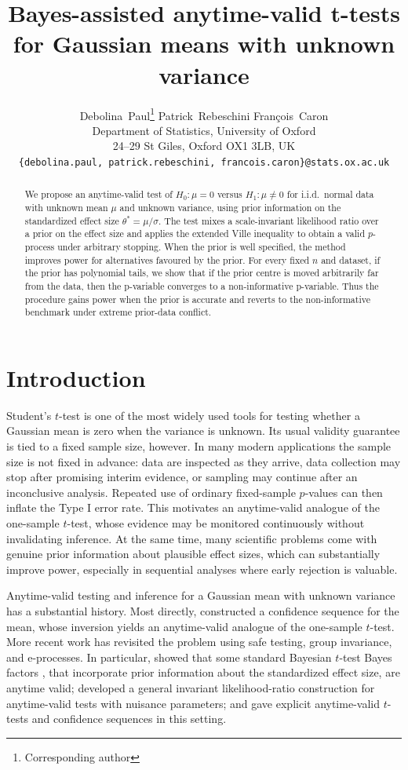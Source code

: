 \documentclass{article}
\title{Bayes-assisted anytime-valid t-tests for
Gaussian means with unknown variance}
\author{%
  Debolina~Paul\thanks{Corresponding author}
  \hspace{1.5cm}
  Patrick~Rebeschini
  \hspace{1.5cm}
  Fran\c{c}ois~Caron
  \\
  Department of Statistics, University of Oxford\\
  24--29 St Giles, Oxford OX1 3LB, UK\\
  \texttt{\{debolina.paul, patrick.rebeschini, francois.caron\}@stats.ox.ac.uk}
}
\begin{document}
\maketitle


\begin{abstract}
  We propose an anytime-valid test of $H_0:\mu=0$ versus $H_1:\mu\neq 0$ for i.i.d.\ normal data with unknown mean $\mu$ and unknown variance, using prior information on the standardized effect size $\theta^\ast=\mu/\sigma$. The test mixes a scale-invariant likelihood ratio over a prior on the effect size and applies the extended Ville inequality to obtain a valid $p$-process under arbitrary stopping. When the prior is well specified, the method improves power for alternatives favoured by the prior. For every fixed $n$ and dataset, if the prior has polynomial tails, we show that if the prior centre is moved arbitrarily far from the data, then the p-variable converges to a non-informative p-variable. Thus the procedure gains power when the prior is accurate and reverts to the non-informative benchmark under extreme prior-data conflict.
\end{abstract}



\section{Introduction}\label{sec:intro}
Student's \(t\)-test is one of the most widely used tools for testing whether a Gaussian mean is zero when the variance is unknown. Its usual validity guarantee is tied to a fixed sample size, however. In many modern
applications the sample size is not fixed in advance: data are inspected as they arrive, data collection may stop after promising interim evidence, or sampling may continue after an inconclusive analysis. Repeated use of ordinary fixed-sample \(p\)-values can then inflate the
Type I error rate. This motivates an anytime-valid analogue of the one-sample \(t\)-test, whose evidence may be monitored continuously without invalidating inference. At the same time, many scientific problems come with genuine prior information about plausible effect
sizes, which can substantially improve power, especially in sequential analyses where early rejection is valuable.


Anytime-valid testing and inference for a Gaussian mean with unknown variance has a substantial history. Most directly, \citet{Lai1976} constructed a confidence sequence for the mean, whose inversion yields an
anytime-valid analogue of the one-sample $t$-test. More recent work has revisited the problem using safe testing, group invariance, and e-processes. In particular, \citet{Grunwald2024} showed that some standard Bayesian $t$-test Bayes factors \citep{Jeffreys1961,Zellner1980,Rouder2009,Gronau2020}, that incorporate prior information about the standardized effect size, are anytime valid; \citet{PerezOrtiz2024} developed a general invariant likelihood-ratio construction for anytime-valid tests with nuisance parameters; and \citet{Wang2025} gave explicit anytime-valid $t$-tests and confidence sequences in this setting.
\end{document}
